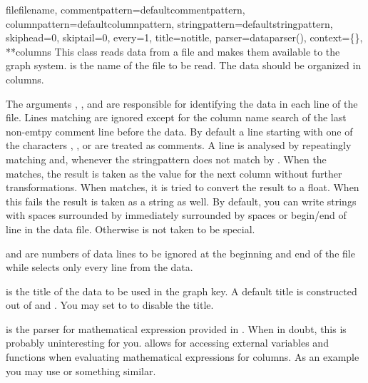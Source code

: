 \begin{classdesc}{file}{filename,
                        commentpattern=defaultcommentpattern,
                        columnpattern=defaultcolumnpattern,
                        stringpattern=defaultstringpattern,
                        skiphead=0, skiptail=0, every=1, title=notitle,
                        parser=dataparser(), context=\{\}, **columns}
  This class reads data from a file and makes them available to the
  graph system.  is the name of the file to be read.
  The data should be organized in columns.

  The arguments , , and
   are responsible for identifying the data in each
  line of the file. Lines matching  are ignored
  except for the column name search of the last non-emtpy comment line
  before the data. By default a line starting with one of the
  characters \character{\#}, \character{\%}, or \character{!} are
  treated as comments. A line is analysed by repeatingly matching
   and, whenever the stringpattern does not match
  by . When the  matches, the
  result is taken as the value for the next column without further
  transformations. When  matches, it is tried to
  convert the result to a float. When this fails the result is taken
  as a string as well. By default, you can write strings with spaces
  surrounded by \character{\textquotedbl} immediately surrounded by
  spaces or begin/end of line in the data file. Otherwise
  \character{\textquotedbl} is not taken to be special.

   and  are numbers of data lines to be
  ignored at the beginning and end of the file while 
  selects only every  line from the data.

   is the title of the data to be used in the graph key. A
  default title is constructed out of  and
  . You may set  to  to disable
  the title.

   is the parser for mathematical expression provided in
  . When in doubt, this is probably uninteresting for
  you.  allows for accessing external variables and
  functions when evaluating mathematical expressions for columns. As
  an example you may use  or something similar.


\end{classdesc}
